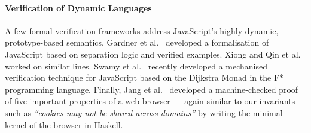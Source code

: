
\paragraph{Verification of Dynamic Languages}
A few formal verification frameworks  address JavaScript's highly
dynamic, prototype-based semantics. Gardner et al.\ \cite{Gardner12}
 developed a formalisation of JavaScript based on separation logic
and verified   examples. Xiong and Qin et
al.\ \cite{XiongPhd,Qin11}  worked on similar lines.
Swamy et al.\ \cite{JSDijkstraMonad}  recently
developed a mechanised verification technique for JavaScript based on
the Dijkstra Monad in the F* programming language.  Finally, Jang et
al.\ \cite{Quark} %
developed a machine-checked proof of
five important properties of a web browser --- again similar to our
 invariants --- such as
\textit{``cookies may not be shared across
  domains''} by writing the minimal kernel of the browser in Haskell.
 
